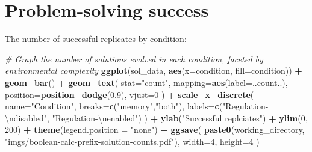 \documentclass[
]{book}
\newenvironment{Shaded}{\begin{snugshade}}{\end{snugshade}}
\newcommand{\CharTok}[1]{\textcolor[rgb]{0.31,0.60,0.02}{#1}}
\newcommand{\CommentTok}[1]{\textcolor[rgb]{0.56,0.35,0.01}{\textit{#1}}}
\newcommand{\DataTypeTok}[1]{\textcolor[rgb]{0.13,0.29,0.53}{#1}}
\newcommand{\DecValTok}[1]{\textcolor[rgb]{0.00,0.00,0.81}{#1}}
\newcommand{\FloatTok}[1]{\textcolor[rgb]{0.00,0.00,0.81}{#1}}
\newcommand{\KeywordTok}[1]{\textcolor[rgb]{0.13,0.29,0.53}{\textbf{#1}}}
\newcommand{\NormalTok}[1]{#1}
\newcommand{\OperatorTok}[1]{\textcolor[rgb]{0.81,0.36,0.00}{\textbf{#1}}}
\newcommand{\StringTok}[1]{\textcolor[rgb]{0.31,0.60,0.02}{#1}}
\begin{document}
\begin{Shaded}
\end{Shaded}

\hypertarget{problem-solving-success-2}{%
\section{Problem-solving success}\label{problem-solving-success-2}}

The number of successful replicates by condition:

\begin{Shaded}
\begin{Highlighting}[]
\CommentTok{\# Graph the number of solutions evolved in each condition, faceted by environmental complexity}
\KeywordTok{ggplot}\NormalTok{(sol\_data, }\KeywordTok{aes}\NormalTok{(}\DataTypeTok{x=}\NormalTok{condition, }\DataTypeTok{fill=}\NormalTok{condition)) }\OperatorTok{+}
\StringTok{  }\KeywordTok{geom\_bar}\NormalTok{() }\OperatorTok{+}
\StringTok{  }\KeywordTok{geom\_text}\NormalTok{(}
    \DataTypeTok{stat=}\StringTok{"count"}\NormalTok{,}
    \DataTypeTok{mapping=}\KeywordTok{aes}\NormalTok{(}\DataTypeTok{label=}\NormalTok{..count..),}
    \DataTypeTok{position=}\KeywordTok{position\_dodge}\NormalTok{(}\FloatTok{0.9}\NormalTok{),}
    \DataTypeTok{vjust=}\DecValTok{0}
\NormalTok{  ) }\OperatorTok{+}
\StringTok{  }\KeywordTok{scale\_x\_discrete}\NormalTok{(}
    \DataTypeTok{name=}\StringTok{"Condition"}\NormalTok{,}
    \DataTypeTok{breaks=}\KeywordTok{c}\NormalTok{(}\StringTok{"memory"}\NormalTok{,}\StringTok{"both"}\NormalTok{),}
    \DataTypeTok{labels=}\KeywordTok{c}\NormalTok{(}\StringTok{"Regulation{-}}\CharTok{\textbackslash{}n}\StringTok{disabled"}\NormalTok{, }\StringTok{"Regulation{-}}\CharTok{\textbackslash{}n}\StringTok{enabled"}\NormalTok{)}
\NormalTok{  ) }\OperatorTok{+}
\StringTok{  }\KeywordTok{ylab}\NormalTok{(}\StringTok{"Successful replciates"}\NormalTok{) }\OperatorTok{+}
\StringTok{  }\KeywordTok{ylim}\NormalTok{(}\DecValTok{0}\NormalTok{, }\DecValTok{200}\NormalTok{) }\OperatorTok{+}
\StringTok{  }\KeywordTok{theme}\NormalTok{(}\DataTypeTok{legend.position =} \StringTok{"none"}\NormalTok{) }\OperatorTok{+}
\StringTok{  }\KeywordTok{ggsave}\NormalTok{(}
    \KeywordTok{paste0}\NormalTok{(working\_directory, }\StringTok{"imgs/boolean{-}calc{-}prefix{-}solution{-}counts.pdf"}\NormalTok{),}
    \DataTypeTok{width=}\DecValTok{4}\NormalTok{,}
    \DataTypeTok{height=}\DecValTok{4}
\NormalTok{  )}
\end{Highlighting}
\end{Shaded}
\end{document}
